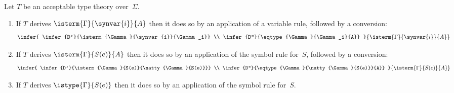 \begin{theorem}
  \label{thm:inversion-principle}%
  Let $T$ be an acceptable type theory over~$\Sigma$.
  \begin{enumerate}

  \item If $T$ derives $\isterm{\Gamma}{\synvar{i}}{A}$ then it does so by an application of a variable rule, followed by a conversion:
    \begin{equation*}
      \infer{
        \infer{D'}{\isterm{\Gamma}{\synvar{i}}{\Gamma_i}}
        \\
       \infer{D''}{\eqtype{\Gamma}{\Gamma_i}{A}}
      }{
        \isterm{\Gamma}{\synvar{i}}{A}
      }
    \end{equation*}
  \item If $T$ derives $\isterm{\Gamma}{S(e)}{A}$ then it does so by an application of the symbol rule for~$S$, followed by a conversion:
    \begin{equation*}
      \infer{
        \infer{D'}{\isterm{\Gamma}{S(e)}{\natty{\Gamma}{S(e)}}}
        \\
       \infer{D''}{\eqtype{\Gamma}{\natty{\Gamma}{S(e)}}{A}}
      }{
        \isterm{\Gamma}{S(e)}{A}
      }
    \end{equation*}
  \item If $T$ derives $\istype{\Gamma}{S(e)}$ then it does so by an application of the symbol rule for~$S$.
  \end{enumerate}
\end{theorem}


